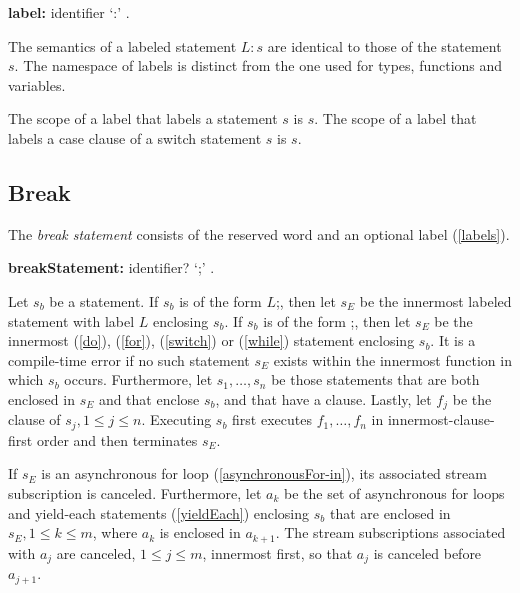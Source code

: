 \documentclass{article}
\newcommand{\code}[1]{{\sf #1}}
\begin{document}
\begin{itemize}


 \begin{grammar}
{\bf label:}
      identifier `{\escapegrammar :}'
    .
 \end{grammar}

\LMHash{}
 The semantics of a labeled statement $L: s$ are identical to those of the statement $s$. The namespace of labels is distinct from the one used for types, functions and variables.

\LMHash{}
The scope of a label that labels a statement $s$ is $s$. The scope of a label that labels a case clause of a switch statement $s$ is $s$.



\subsection{ Break}

\LMHash{}
The {\em break statement} consists of the reserved word \BREAK{} and an optional label (\ref{labels}).

\begin{grammar}
{\bf breakStatement:}
     \BREAK{} identifier? `{\escapegrammar ;}'
    .
 \end{grammar}

\LMHash{}
Let $s_b$ be a \BREAK{} statement. If $s_b$ is of the form  \code{\BREAK{} $L$;}, then let $s_E$ be the innermost labeled statement with label $L$ enclosing $s_b$. If $s_b$ is of the form \code{\BREAK{};},  then let $s_E$ be the innermost  \DO{} (\ref{do}), \FOR{} (\ref{for}), \SWITCH{} (\ref{switch}) or \WHILE{} (\ref{while}) statement enclosing  $s_b$. It is a compile-time error if no such statement $s_E$ exists within the innermost function in which  $s_b$ occurs.  Furthermore, let $s_1, \ldots, s_n$ be those \TRY{} statements that are both enclosed in $s_E$ and that enclose  $s_b$, and that have a \FINALLY{} clause. Lastly, let $f_j$ be the \FINALLY{} clause of $s_j, 1 \le j \le n$.   Executing  $s_b$ first executes $f_1, \ldots,  f_n$ in innermost-clause-first  order and then terminates $s_E$.

\LMHash{}
If $s_E$ is an asynchronous for loop (\ref{asynchronousFor-in}), its associated stream subscription is canceled. Furthermore, let $a_k$ be the set of asynchronous for loops  and yield-each statements (\ref{yieldEach}) enclosing $s_b$ that are enclosed in $s_E , 1 \le k \le m$, where $a_k$ is enclosed in $a_{k+1}$.   The stream subscriptions associated with $a_j$ are canceled, $1 \le j \le m$, innermost first, so that $a_j$ is canceled before $a_{j+1}$.




\end{itemize}
\end{document}
